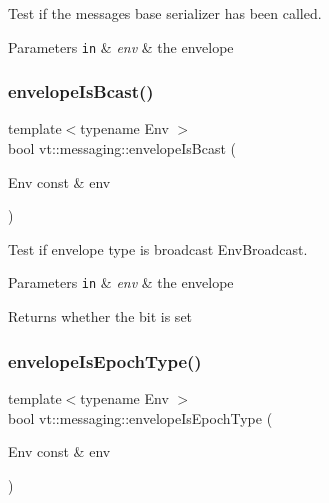 Test if the message\textquotesingle{}s base serializer has been called. 


\begin{DoxyParams}[1]{Parameters}
\mbox{\tt in}  & {\em env} & the envelope \\
\hline
\end{DoxyParams}
\mbox{\label{namespacevt_1_1messaging_a54db7616bc28f0aec1a4830acc2105f7}} 
\subsubsection{\texorpdfstring{envelope\+Is\+Bcast()}{envelopeIsBcast()}}
{\footnotesize\ttfamily template$<$typename Env $>$ \\
bool vt\+::messaging\+::envelope\+Is\+Bcast (\begin{DoxyParamCaption}\item[{Env const \&}]{env }\end{DoxyParamCaption})\hspace{0.3cm}{\ttfamily [inline]}}



Test if envelope type is broadcast {\ttfamily Env\+Broadcast}. 


\begin{DoxyParams}[1]{Parameters}
\mbox{\tt in}  & {\em env} & the envelope\\
\hline
\end{DoxyParams}
\begin{DoxyReturn}{Returns}
whether the bit is set 
\end{DoxyReturn}
\mbox{\label{namespacevt_1_1messaging_a35972fd8b7d620e41e94e883e8e0cca4}} 
\subsubsection{\texorpdfstring{envelope\+Is\+Epoch\+Type()}{envelopeIsEpochType()}}
{\footnotesize\ttfamily template$<$typename Env $>$ \\
bool vt\+::messaging\+::envelope\+Is\+Epoch\+Type (\begin{DoxyParamCaption}\item[{Env const \&}]{env }\end{DoxyParamCaption})\hspace{0.3cm}{\ttfamily [inline]}}




